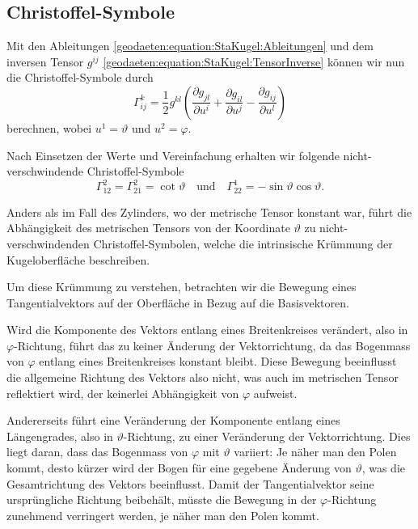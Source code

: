 \subsection{Christoffel-Symbole}
Mit den Ableitungen \eqref{geodaeten:equation:StaKugel:Ableitungen} und dem inversen Tensor $g^{i\!j}$ \eqref{geodaeten:equation:StaKugel:TensorInverse} können wir nun die Christoffel-Symbole durch
\begin{equation}
	\Gamma_{i\!j}^k = \frac{1}{2} g^{kl} \left( \frac{\partial g_{jl}}{\partial u^i} + \frac{\partial g_{il}}{\partial u^j} - \frac{\partial g_{i\!j}}{\partial u^l} \right)
\end{equation}
berechnen,
wobei $u^1 = \vartheta$ und $u^2 = \varphi$.

Nach Einsetzen der Werte und Vereinfachung erhalten wir folgende nicht-verschwindende Christoffel-Symbole
\begin{equation}
	\Gamma_{12}^2 = \Gamma_{21}^2 = \cot\vartheta \quad \text{und} \quad \Gamma_{22}^1 = -\sin\vartheta \cos\vartheta.
\end{equation}

Anders als im Fall des Zylinders, wo der metrische Tensor konstant war, führt die Abhängigkeit des metrischen Tensors von der Koordinate $\vartheta$ zu nicht-verschwindenden Christoffel-Symbolen, welche die intrinsische Krümmung der Kugeloberfläche beschreiben.

Um diese Krümmung zu verstehen, betrachten wir die Bewegung eines Tangentialvektors auf der Oberfläche in Bezug auf die Basisvektoren.

Wird die Komponente des Vektors entlang eines Breitenkreises verändert, also in $\varphi$-Richtung, führt das zu keiner Änderung der Vektorrichtung, da das Bogenmass von $\varphi$ entlang eines Breitenkreises konstant bleibt.
Diese Bewegung beeinflusst die allgemeine Richtung des Vektors also nicht, was auch im metrischen Tensor reflektiert wird, der keinerlei Abhängigkeit von $\varphi$ aufweist.

Andererseits führt eine Veränderung der Komponente entlang eines Längengrades, also in $\vartheta$-Richtung, zu einer Veränderung der Vektorrichtung.
Dies liegt daran, dass das Bogenmass von $\varphi$ mit $\vartheta$ variiert: 
Je näher man den Polen kommt, desto kürzer wird der Bogen für eine gegebene Änderung von $\vartheta$, was die Gesamtrichtung des Vektors beeinflusst. 
Damit der Tangentialvektor seine ursprüngliche Richtung beibehält, müsste die Bewegung in der $\varphi$-Richtung zunehmend verringert werden, je näher man den Polen kommt.


